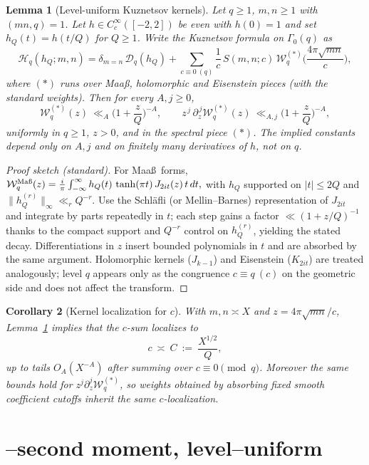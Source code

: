 \documentclass[11pt]{article}
\newtheorem{lemma}{Lemma}[part]
\newtheorem{corollary}[lemma]{Corollary}
\theoremstyle{definition}
\theoremstyle{remark}
\numberwithin{equation}{part}
\begin{document}
\begin{lemma}[Level-uniform Kuznetsov kernels]\label{lem:kuznetsov-uniform}
	Let $q\ge1$, $m,n\ge1$ with $(mn,q)=1$.
	Let $h\in C_c^\infty([-2,2])$ be even with $h(0)=1$ and set $h_Q(t)=h(t/Q)$ for $Q\ge1$.
	Write the Kuznetsov formula on $\Gamma_0(q)$ as
	\[
		\mathcal H_q(h_Q;m,n)
		=\delta_{m=n}\,\mathcal D_q(h_Q)
		+\sum_{c\equiv 0\ (q)} \frac{1}{c}\,S(m,n;c)\,\mathcal W_q^{(*)}\!\Big(\frac{4\pi\sqrt{mn}}{c}\Big),
	\]
	where $(*)$ runs over Maa\ss, holomorphic and Eisenstein pieces (with the standard weights).
	Then for every $A,j\ge0$,
	\[
		\mathcal W_q^{(*)}(z)\ \ll_A \Big(1+\frac{z}{Q}\Big)^{-A},
		\qquad
		z^{\,j}\,\partial_z^{\,j}\mathcal W_q^{(*)}(z)\ \ll_{A,j} \Big(1+\frac{z}{Q}\Big)^{-A},
	\]
	uniformly in $q\ge1$, $z>0$, and in the spectral piece $(*)$.
	The implied constants depend only on $A,j$ and on finitely many derivatives of $h$, not on $q$.
\end{lemma}

\begin{proof}[Proof sketch (standard)]
	For Maa\ss\ forms,
	\(
	\mathcal W_q^{\mathrm{Ma\text\ss}}(z)=\frac{i}{\pi}\int_{-\infty}^{\infty} h_Q(t)\,\tanh(\pi t)\,J_{2it}(z)\,t\,dt,
	\)
	with $h_Q$ supported on $|t|\le 2Q$ and $\|h_Q^{(r)}\|_\infty\ll_r Q^{-r}$.
	Use the Schl\"afli (or Mellin–Barnes) representation of $J_{2it}$ and integrate by parts repeatedly in $t$;
	each step gains a factor $\ll (1+z/Q)^{-1}$ thanks to the compact support and $Q^{-r}$ control on $h_Q^{(r)}$,
	yielding the stated decay. Differentiations in $z$ insert bounded polynomials in $t$ and are absorbed by the same argument.
	Holomorphic kernels ($J_{k-1}$) and Eisenstein ($K_{2it}$) are treated analogously; level $q$ appears only as the congruence $c\equiv q\ (c)$ on the geometric side and does not affect the transform.
\end{proof}

\begin{corollary}[Kernel localization for $c$]\label{cor:kernel-localization}
	With $m,n\asymp X$ and $z=4\pi\sqrt{mn}/c$, Lemma~\ref{lem:kuznetsov-uniform} implies that the $c$-sum localizes to
	\[
		c\ \asymp\ C\ :=\ \frac{X^{1/2}}{Q},
	\]
	up to tails $O_A(X^{-A})$ after summing over $c\equiv0\pmod q$.
	Moreover the same bounds hold for $z^j\partial_z^j\mathcal W_q^{(*)}$, so weights obtained by absorbing fixed smooth coefficient cutoffs inherit the same $c$-localization.
\end{corollary}


\section{\textbf\textDelta--second moment, level--uniform}
\end{document}

